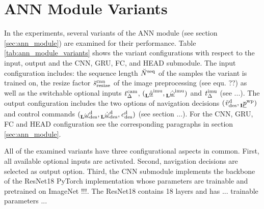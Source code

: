 \section{ANN Module Variants}
In the experiments, several
variants of the ANN module (see section \ref{sec:ann_module})
are examined for their performance.
Table \ref{tab:ann_module_variants} shows the variant configurations
with respect to the input, output and the 
CNN, GRU, FC, and HEAD submodule.
The input configuration includes:
the sequence length ${}_{}^{} \breve{N}^{\text{seq}}_{}$ of the samples the variant is trained on,
the resize factor ${}_{}^{} \breve{s}^{\text{cnn}}_{\text{resize}}$ of the image preprocessing (see equ. ??)
as well as the switchable optional inputs
${}_{}^{} {t}^{\text{cam}}_{\Delta }$, 
$({}_{\textbf{L}}^{} \hat{\underline a}^{\text{imu}}_{},{}_{\textbf{L}}^{} \hat{\underline \omega}^{\text{imu}}_{})$
and
${}_{}^{} {t}^{\text{imu}}_{\Delta }$ (see ...).
The output configuration includes
the two options of navigation decisions 
$({}_{}^{} \tilde{v}^{\text{d}}_{\text{des}}, {}_{\textbf{I}}^{} {\underline p}^{\text{wp}}_{})$
and control commands 
$({}_{\textbf{L}}^{} {\underline \omega}^{\text{d}}_{\text{des}}, {}_{\textbf{L}}^{} \dot{\underline \omega}^{\text{d}}_{\text{des}}, {}_{}^{} {c}^{\text{d}}_{\text{des}})$ (see section ...).
For the CNN, GRU, FC and HEAD configuration
see the corresponding paragraphs in section \ref{sec:ann_module}. 


All of the examined variants have three configurational aspects in common.
First, all available optional inputs are activated.
Second, navigation decisions are selected as output option.
Third, the CNN submodule implements the backbone of the ResNet18 PyTorch implementation
whose parameters are trainable and pretrained on ImageNet !!!.
The ResNet18 contains 18 layers and has ... trainable parameters ...







